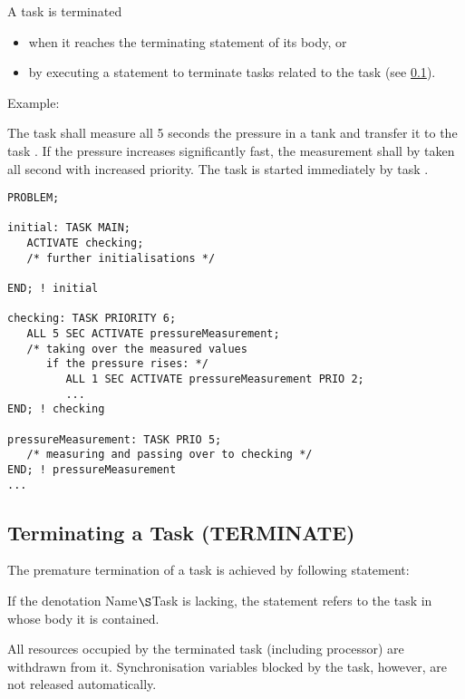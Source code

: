 A task is terminated
\begin{itemize}
\item when it reaches the terminating  statement of its body, or
\item by executing a statement to terminate tasks related to the task
(see \ref{sec_terminate}).
\end{itemize}

Example:

The task  shall measure all 5 seconds
 the pressure in a tank and transfer it to the task .
 If the pressure increases significantly fast, the measurement
 shall by taken all second with increased priority. 
The task  is started immediately by task .

\begin{lstlisting}
PROBLEM;

initial: TASK MAIN;
   ACTIVATE checking;
   /* further initialisations */
 
END; ! initial
       
checking: TASK PRIORITY 6;
   ALL 5 SEC ACTIVATE pressureMeasurement;
   /* taking over the measured values
      if the pressure rises: */
         ALL 1 SEC ACTIVATE pressureMeasurement PRIO 2;
         ...
END; ! checking
 
pressureMeasurement: TASK PRIO 5;
   /* measuring and passing over to checking */
END; ! pressureMeasurement
...
\end{lstlisting}



\subsection{Terminating a Task (TERMINATE)}    %
\label{sec_terminate}

The premature termination of a task is achieved by following
statement:

\begin{grammarframe}

\end{grammarframe}

If the denotation Name$\S $Task is lacking, the statement refers to
the task in whose body it is contained.

All resources occupied by the terminated task (including processor) are
withdrawn from it. Synchronisation variables blocked by the task,
however, are not released automatically.

